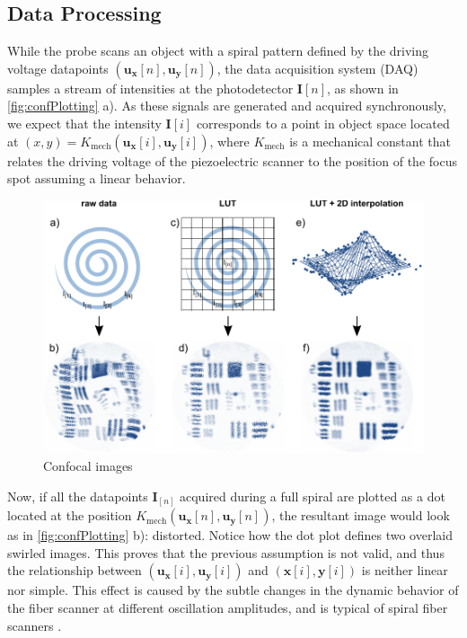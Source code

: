 \subsection{Data Processing}
While the probe scans an object with a spiral pattern defined by the driving voltage datapoints $(\mathbf{u_x}[n], \mathbf{u_y}[n])$, the data acquisition system (DAQ) samples a stream of intensities at the photodetector $\mathbf{I}[n]$, as shown in \autoref{fig:confPlotting} a). As these signals are generated and acquired synchronously, we expect that the intensity $\mathbf{I}[i]$ corresponds to a point in object space located at 
$(x, y) = K_\mathrm{mech}(\mathbf{u_x}[i], \mathbf{u_y}[i])$, where $K_\mathrm{mech}$ is a mechanical constant that relates the driving voltage of the piezoelectric scanner to the position of the focus spot assuming a linear behavior. 

\begin{figure}[h!]\centering \includegraphics{figures/50_Measurements/conf/proc/Plotting.pdf}
      \caption{Confocal images}
      \label{fig:confPlotting}
\end{figure}

Now, if all the datapoints $\mathbf{I}_{[n]}$ acquired during a full spiral are plotted as a dot located at the position $K_\mathrm{mech}(\mathbf{u_x}[n], \mathbf{u_y}[n])$, the resultant image would look as in \autoref{fig:confPlotting} b): distorted. Notice how the dot plot defines two overlaid swirled images. This proves that the previous assumption is not valid, and thus the relationship between $(\mathbf{u_x}[i], \mathbf{u_y}[i])$ and $(\mathbf{x}[i], \mathbf{y}[i])$ is neither linear nor simple. This effect is caused by the subtle changes in the dynamic behavior of the fiber scanner at different oscillation amplitudes, and is typical of spiral fiber scanners \cite{Seibel2006}.


